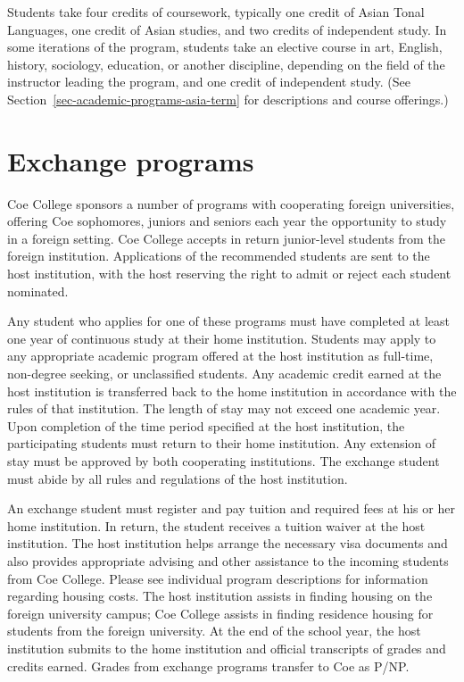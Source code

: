 \documentclass[
  letterpaper,
]{scrbook}
\begin{document}
Students take four credits of coursework, typically one credit of Asian
Tonal Languages, one credit of Asian studies, and two credits of
independent study. In some iterations of the program, students take an
elective course in art, English, history, sociology, education, or
another discipline, depending on the field of the instructor leading the
program, and one credit of independent study. (See
Section~\ref{sec-academic-programs-asia-term} for descriptions and
course offerings.)

\section{Exchange programs}\label{exchange-programs}

Coe College sponsors a number of programs with cooperating foreign
universities, offering Coe sophomores, juniors and seniors each year the
opportunity to study in a foreign setting. Coe College accepts in return
junior-level students from the foreign institution. Applications of the
recommended students are sent to the host institution, with the host
reserving the right to admit or reject each student nominated.

Any student who applies for one of these programs must have completed at
least one year of continuous study at their home institution. Students
may apply to any appropriate academic program offered at the host
institution as full-time, non-degree seeking, or unclassified students.
Any academic credit earned at the host institution is transferred back
to the home institution in accordance with the rules of that
institution. The length of stay may not exceed one academic year. Upon
completion of the time period specified at the host institution, the
participating students must return to their home institution. Any
extension of stay must be approved by both cooperating institutions. The
exchange student must abide by all rules and regulations of the host
institution.

An exchange student must register and pay tuition and required fees at
his or her home institution. In return, the student receives a tuition
waiver at the host institution. The host institution helps arrange the
necessary visa documents and also provides appropriate advising and
other assistance to the incoming students from Coe College. Please see
individual program descriptions for information regarding housing costs.
The host institution assists in finding housing on the foreign
university campus; Coe College assists in finding residence housing for
students from the foreign university. At the end of the school year, the
host institution submits to the home institution and official
transcripts of grades and credits earned. Grades from exchange programs
transfer to Coe as P/NP.
\end{document}
